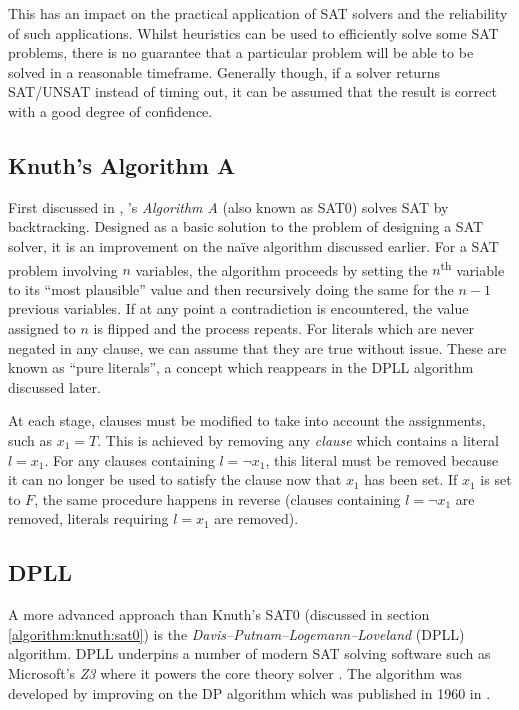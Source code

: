 \documentclass[a4paper,openany,12pt]{book}
\begin{document}
This has an impact on the practical application of SAT solvers and the reliability of such applications.
Whilst heuristics can be used to efficiently solve some SAT problems, there is no guarantee that a particular problem
will be able to be solved in a reasonable timeframe.
Generally though, if a solver returns SAT/UNSAT instead of timing out, it can be assumed that the result is correct with
a good degree of confidence.

\subsection{Knuth's Algorithm A}

First discussed in \citet{Knuth:2015:ACP:2898950}, \citeauthor{Knuth:2015:ACP:2898950}'s \emph{Algorithm A} (also known
as \textsc{SAT0}) solves SAT by backtracking.
Designed as a basic solution to the problem of designing a SAT solver, it is an improvement on the naïve algorithm
discussed earlier.
For a SAT problem involving $n$ variables, the algorithm proceeds by setting the $n$\textsuperscript{th} variable to its
``most plausible'' value and then recursively doing the same for the $n-1$ previous variables.
If at any point a contradiction is encountered, the value assigned to $n$ is flipped and the process repeats.
For literals which are never negated in any clause, we can assume that they are true without issue.
These are known as ``pure literals'', a concept which reappears in the DPLL algorithm discussed later.

At each stage, clauses must be modified to take into account the assignments, such as $x_1 = T$.
This is achieved by removing any \emph{clause} which contains a literal $l = x_1$.
For any clauses containing $l = \neg x_1$, this literal must be removed because it can no longer be used to satisfy the
clause now that $x_1$ has been set. If $x_1$ is set to $F$, the same procedure happens in reverse (clauses containing $l
= \neg x_1$ are removed, literals requiring $l = x_1$ are removed).

\label{algorithm:knuth:sat0}

\subsection{DPLL}

A more advanced approach than Knuth's SAT0 (discussed in section \ref{algorithm:knuth:sat0}) is the
\emph{Davis–Putnam–Logemann–Loveland} (DPLL) algorithm.
DPLL underpins a number of modern SAT solving software such as Microsoft's \emph{Z3} where it powers the core theory
solver \citep{de2008z3}.
The algorithm was developed by improving on the DP algorithm which was published in 1960 in
\citet{Davis:1960:CPQ:321033.321034}.
\end{document}
